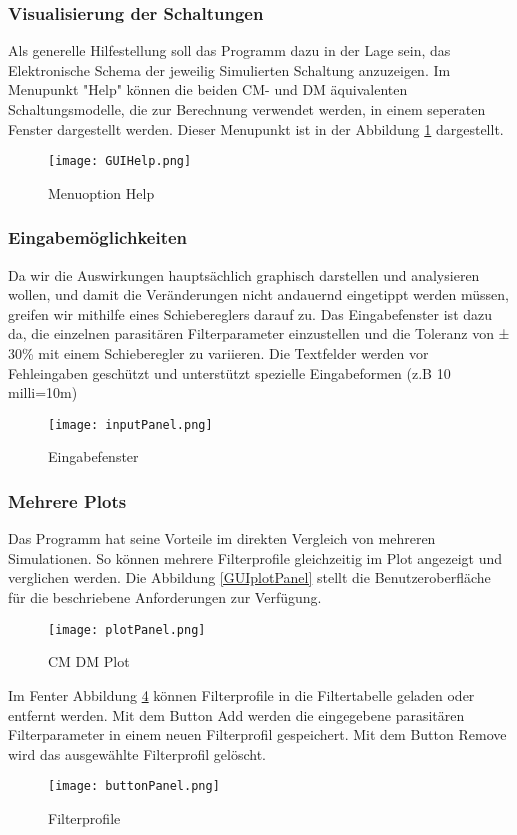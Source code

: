 \bigskip
\subsubsection{Visualisierung der Schaltungen} \label{subsubsec:visualisierungderschaltungen}
Als generelle Hilfestellung soll das Programm dazu in der Lage sein, das Elektronische Schema der jeweilig Simulierten Schaltung anzuzeigen.
Im Menupunkt "Help" können die beiden CM- und DM äquivalenten Schaltungsmodelle, die zur Berechnung verwendet werden, in einem seperaten Fenster dargestellt werden. Dieser Menupunkt ist in der Abbildung \ref{fig:GUIHelp}  dargestellt.

\begin{figure}[H]
	\centering
	\texttt{[image: GUIHelp.png]}
	\caption{Menuoption Help}
	\label{fig:GUIHelp}
\end{figure}
\bigskip

\subsubsection{Eingabemöglichkeiten}\label{subsubsec:eingabemöglichkeiten}
Da wir  die Auswirkungen hauptsächlich graphisch darstellen und analysieren wollen, und damit die Veränderungen nicht andauernd eingetippt werden müssen, greifen wir mithilfe eines Schiebereglers darauf zu. Das Eingabefenster ist dazu da, die einzelnen parasitären Filterparameter einzustellen und die Toleranz von ± 30\% mit einem Schieberegler zu variieren. Die Textfelder werden vor Fehleingaben geschützt und unterstützt spezielle Eingabeformen (z.B 10 milli=10m)
\begin{figure}[H]
	\centering
	\texttt{[image: inputPanel.png]}
	\caption{Eingabefenster}
	\label{fig:GUIinputPanel}
\end{figure}
\bigskip

\subsubsection{Mehrere Plots}\label{subsubsec:mehrereplots}
Das Programm hat seine Vorteile im direkten Vergleich von mehreren Simulationen. So können mehrere Filterprofile gleichzeitig im Plot angezeigt und verglichen werden. Die Abbildung \ref{GUIplotPanel} stellt die Benutzeroberfläche für die beschriebene Anforderungen zur Verfügung.
\begin{figure}[H]
	\centering
	\texttt{[image: plotPanel.png]}
	\caption{CM DM Plot}
	\label{fig:GUIplotPanel}
\end{figure}
Im Fenter Abbildung \ref{fig:buttonPanel} können Filterprofile in die Filtertabelle geladen oder entfernt werden. Mit dem Button Add werden die eingegebene parasitären Filterparameter in einem neuen Filterprofil gespeichert. Mit dem Button Remove wird das ausgewählte Filterprofil gelöscht.
\begin{figure}[H]
	\centering
	\texttt{[image: buttonPanel.png]}
	\caption{Filterprofile}
	\label{fig:buttonPanel}
\end{figure}
\bigskip


